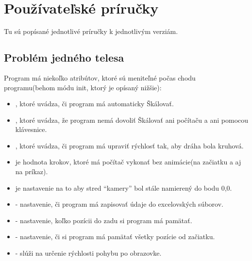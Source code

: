 \chapter{Používateľské príručky}
\tab[5 mm] Tu sú popísané jednotlivé príručky k jednotlivým verziám.
\section{ Problém jedného telesa }
\tab[5 mm] Program má niekoľko atribútov, ktoré sú meniteľné počas chodu programu(behom módu init, ktorý je opísaný nižšie): 
\begin{itemize}
\item	{}, ktoré uvádza, či program má automaticky Škálovať.
\item	 {}, ktoré uvádza, že program nemá dovoliť Škálovať ani počítaču a ani pomocou klávesnice. 
\item	{}, ktoré uvádza, či program má upraviť rýchlosť tak, aby dráha bola kruhová. 
\item	{} je hodnota krokov, ktoré má počítač vykonať bez animácie(na začiatku a aj na príkaz). 
\item	{} je nastavenie na to aby stred “kamery” bol stále namierený do bodu 0,0.
\item	{} - nastavenie, či program má zapisovať údaje do excelovských súborov. 
\item	{} - nastavenie, koľko pozícii do zadu si program má pamätať.
\item	 {} - nastavenie, či si program má pamätať všetky pozície od začiatku.
\item	{} - slúži na určenie rýchlosti pohybu po obrazovke.
\end{itemize}

